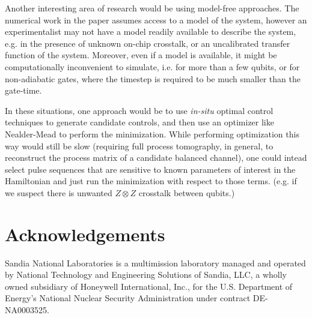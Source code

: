 \documentclass[aps,nofootinbib,pra,notitlepage,twocolumn]{revtex4-1}
\begin{document}
Another interesting area of research would be using model-free approaches. The numerical work in the paper assumes access to a model of the system, however an experimentalist may not have a model readily available to describe the system, e.g. in the presence of unknown on-chip crosstalk, or an uncalibrated transfer function of the system. Moreover, even if a model is available, it might be computationally inconvenient to simulate, i.e. for more than a few qubits, or for non-adiabatic gates, where the timestep is required to be much smaller than the gate-time. 

In these situations, one approach would be to use \textit{in-situ} optimal control techniques \cite{Wu2018, Kelly2014, Ferrie2015} to generate candidate controls, and then use an optimizer like Nealder-Mead to perform the minimization. While performing optimization this way would still be slow (requiring full process tomography, in general, to reconstruct the process matrix of a candidate balanced channel), one could intead select pulse sequences that are sensitive to known parameters of interest in the Hamiltonian and just run the minimization with respect to those terms. (e.g. if we suspect there is unwanted $Z\otimes Z$ crosstalk between qubits.)

\section{Acknowledgements}
Sandia National Laboratories is a multimission laboratory managed and operated by National Technology and Engineering Solutions of Sandia, LLC, a wholly owned subsidiary of Honeywell International, Inc., for the U.S. Department of Energy's National Nuclear Security Administration under contract DE-NA0003525.

\end{document}
